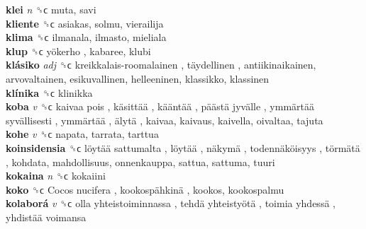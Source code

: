 \textbf{klei} \emph{n}  ␝ϲ  muta, savi  \\
\textbf{kliente} ␝ϲ  asiakas, solmu, vierailija  \\
\textbf{klima} ␝ϲ  ilmanala, ilmasto, mieliala  \\
\textbf{klup} ␝ϲ   yökerho , kabaree, klubi  \\
\textbf{klásiko} \emph{adj}  ␝ϲ   kreikkalais-roomalainen ,  täydellinen , antiikinaikainen, arvovaltainen, esikuvallinen, helleeninen, klassikko, klassinen  \\
\textbf{klínika} ␝ϲ  klinikka  \\
\textbf{koba} \emph{v}  ␝ϲ   kaivaa pois ,  käsittää ,  kääntää ,  päästä jyvälle ,  ymmärtää syvällisesti ,  ymmärtää ,  älytä , kaivaa, kaivaus, kaivella, oivaltaa, tajuta  \\
\textbf{kohe} \emph{v}  ␝ϲ  napata, tarrata, tarttua  \\
\textbf{koinsidensia} ␝ϲ   löytää sattumalta ,  löytää ,  näkymä ,  todennäköisyys ,  törmätä , kohdata, mahdollisuus, onnenkauppa, sattua, sattuma, tuuri  \\
\textbf{kokaina} \emph{n}  ␝ϲ  kokaiini  \\
\textbf{koko} ␝ϲ   Cocos nucifera ,  kookospähkinä , kookos, kookospalmu  \\
\textbf{kolaborá} \emph{v}  ␝ϲ   olla yhteistoiminnassa ,  tehdä yhteistyötä ,  toimia yhdessä ,  yhdistää voimansa   \\
